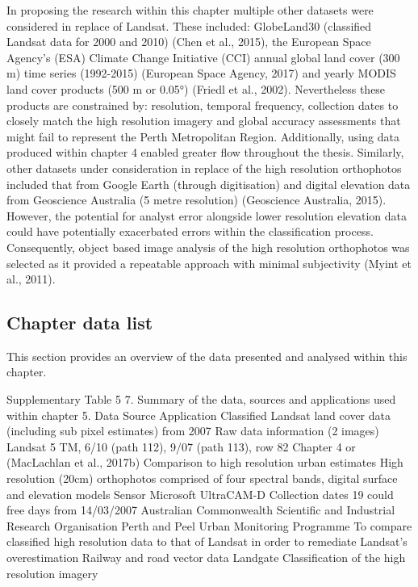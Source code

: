 \documentclass[]{book}
\begin{document}
In proposing the research within this chapter multiple other datasets
were considered in replace of Landsat. These included: GlobeLand30
(classified Landsat data for 2000 and 2010) (Chen et al., 2015), the
European Space Agency's (ESA) Climate Change Initiative (CCI) annual
global land cover (300 m) time series (1992-2015) (European Space
Agency, 2017) and yearly MODIS land cover products (500 m or 0.05°)
(Friedl et al., 2002). Nevertheless these products are constrained by:
resolution, temporal frequency, collection dates to closely match the
high resolution imagery and global accuracy assessments that might fail
to represent the Perth Metropolitan Region. Additionally, using data
produced within chapter 4 enabled greater flow throughout the thesis.
Similarly, other datasets under consideration in replace of the high
resolution orthophotos included that from Google Earth (through
digitisation) and digital elevation data from Geoscience Australia (5
metre resolution) (Geoscience Australia, 2015). However, the potential
for analyst error alongside lower resolution elevation data could have
potentially exacerbated errors within the classification process.
Consequently, object based image analysis of the high resolution
orthophotos was selected as it provided a repeatable approach with
minimal subjectivity (Myint et al., 2011).

\subsection{Chapter data list}\label{chapter-data-list-1}

This section provides an overview of the data presented and analysed
within this chapter.

Supplementary Table 5 7. Summary of the data, sources and applications
used within chapter 5. Data Source Application Classified Landsat land
cover data (including sub pixel estimates) from 2007 Raw data
information (2 images) Landsat 5 TM, 6/10 (path 112), 9/07 (path 113),
row 82 Chapter 4 or (MacLachlan et al., 2017b) Comparison to high
resolution urban estimates High resolution (20cm) orthophotos comprised
of four spectral bands, digital surface and elevation models Sensor
Microsoft UltraCAM-D Collection dates 19 could free days from 14/03/2007
Australian Commonwealth Scientific and Industrial Research Organisation
Perth and Peel Urban Monitoring Programme To compare classified high
resolution data to that of Landsat in order to remediate Landsat's
overestimation Railway and road vector data Landgate Classification of
the high resolution imagery


\end{document}
